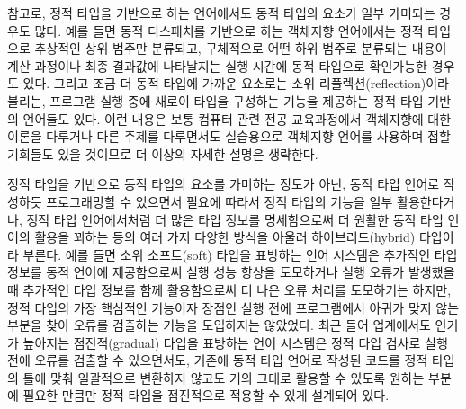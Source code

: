 참고로, 정적 타입을 기반으로 하는 언어에서도 동적 타입의 요소가 일부
가미되는 경우도 많다. 예를 들면 동적 디스패치를 기반으로 하는
객체지향 언어에서는 정적 타입으로 추상적인 상위 범주만 분류되고,
구체적으로 어떤 하위 범주로 분류되는 내용이 계산 과정이나 최종 결과값에
나타날지는 실행 시간에 동적 타입으로 확인가능한 경우도 있다. 그리고
조금 더 동적 타입에 가까운 요소로는 소위 리플렉션(reflection)이라 불리는,
프로그램 실행 중에 새로이 타입을 구성하는 기능을 제공하는 정적 타입 기반의
언어들도 있다. 이런 내용은 보통 컴퓨터 관련 전공 교육과정에서 객체지향에
대한 이론을 다루거나 다른 주제를 다루면서도 실습용으로 객체지향 언어를
사용하며 접할 기회들도 있을 것이므로 더 이상의 자세한 설명은 생략한다.

정적 타입을 기반으로 동적 타입의 요소를 가미하는 정도가 아닌,
동적 타입 언어로 작성하듯 프로그래밍할 수 있으면서 필요에 따라서
정적 타입의 기능을 일부 활용한다거나, 정적 타입 언어에서처럼
더 많은 타입 정보를 명세함으로써 더 원활한 동적 타입 언어의 활용을
꾀하는 등의 여러 가지 다양한 방식을 아울러 하이브리드(hybrid) 타입이라
부른다. 예를 들면 소위 소프트(soft) 타입\cite{Cartwright2004soft}을
표방하는 언어 시스템은 추가적인 타입 정보를 동적 언어에 제공함으로써
실행 성능 향상을 도모하거나 실행 오류가 발생했을 때 추가적인 타입 정보를
함께 활용함으로써 더 나은 오류 처리를 도모하기는 하지만, 정적 타입의
가장 핵심적인 기능이자 장점인 실행 전에 프로그램에서 아귀가 맞지 않는
부분을 찾아 오류를 검출하는 기능을 도입하지는 않았었다. 최근 들어
업계에서도 인기가 높아지는 점진적(gradual) 타입\cite{Jeremy2006gradual}을
표방하는 언어 시스템은 정적 타입 검사로 실행 전에 오류를 검출할 수
있으면서도, 기존에 동적 타입 언어로 작성된 코드를 정적 타입의 틀에 맞춰
일괄적으로 변환하지 않고도 거의 그대로 활용할 수 있도록 원하는 부분에
필요한 만큼만 정적 타입을 점진적으로 적용할 수 있게 설계되어 있다.


